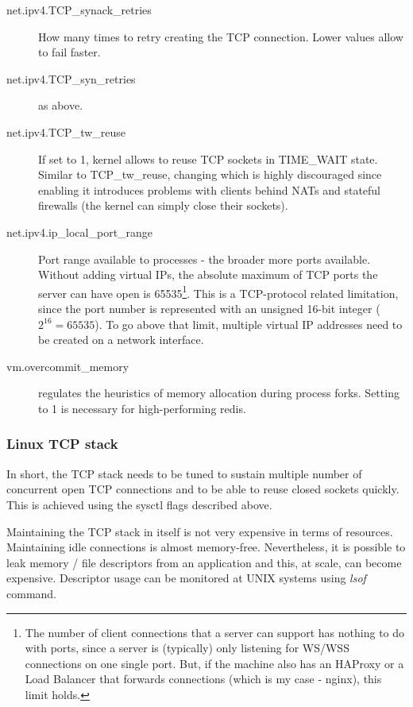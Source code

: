 \documentclass{uvamscse}
\begin{document}
\begin{description}
  \item[net.ipv4.TCP\_synack\_retries] How many times to retry creating the TCP connection. Lower values allow to fail faster.
  \item[net.ipv4.TCP\_syn\_retries] as above.
  \item[net.ipv4.TCP\_tw\_reuse] If set to 1, kernel allows to reuse TCP sockets in TIME\_WAIT state. Similar to TCP\_tw\_reuse, changing which is highly discouraged since enabling it introduces problems with clients behind NATs and stateful firewalls (the kernel can simply close their sockets).
  \item[net.ipv4.ip\_local\_port\_range] Port range available to processes - the broader more ports available. Without adding virtual IPs, the absolute maximum of TCP ports the server can have open is 65535\footnote{The number of client connections that a server can support has nothing to do with ports, since a server is (typically) only listening for WS/WSS connections on one single port. But, if the machine also has an HAProxy or a Load Balancer that forwards connections (which is my case - nginx), this limit holds.}. This is a TCP-protocol related limitation, since the port number is represented with an unsigned 16-bit integer ($2^{16}=65535$). To go above that limit, multiple virtual IP addresses need to be created on a network interface.
  \item[vm.overcommit\_memory] regulates the heuristics of memory allocation during process forks. Setting to 1 is necessary for high-performing redis.
\end{description}

\subsubsection{Linux TCP stack}

In short, the TCP stack needs to be tuned to sustain multiple number of concurrent open TCP connections and to be able to reuse closed sockets quickly. This is achieved using the sysctl flags described above.

Maintaining the TCP stack in itself is not very expensive in terms of resources. Maintaining idle connections is almost memory-free. Nevertheless, it is possible to leak memory / file descriptors from an application and this, at scale, can become expensive. Descriptor usage can be monitored at UNIX systems using \textit{lsof} command.
\end{document}

